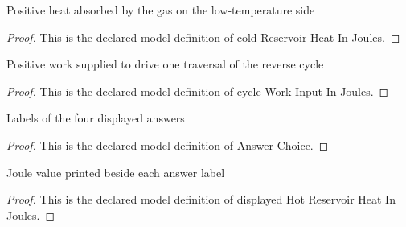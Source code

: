 \begin{definition}
  \label{def:physics:phyx-mini-0435:phyxminiproblems-problemphyxmini0435-coldreservoirheatinjoules}
  Positive heat absorbed by the gas on the low-temperature side
\end{definition}
\begin{proof}
  This is the declared model definition of cold Reservoir Heat In Joules.
\end{proof}
\begin{definition}
  \label{def:physics:phyx-mini-0435:phyxminiproblems-problemphyxmini0435-cycleworkinputinjoules}
  Positive work supplied to drive one traversal of the reverse cycle
\end{definition}
\begin{proof}
  This is the declared model definition of cycle Work Input In Joules.
\end{proof}
\begin{definition}
  \label{def:physics:phyx-mini-0435:phyxminiproblems-problemphyxmini0435-answerchoice}
  Labels of the four displayed answers
\end{definition}
\begin{proof}
  This is the declared model definition of Answer Choice.
\end{proof}
\begin{definition}
  \label{def:physics:phyx-mini-0435:phyxminiproblems-problemphyxmini0435-displayedhotreservoirheatinjoules}
  Joule value printed beside each answer label
\end{definition}
\begin{proof}
  This is the declared model definition of displayed Hot Reservoir Heat In Joules.
\end{proof}
